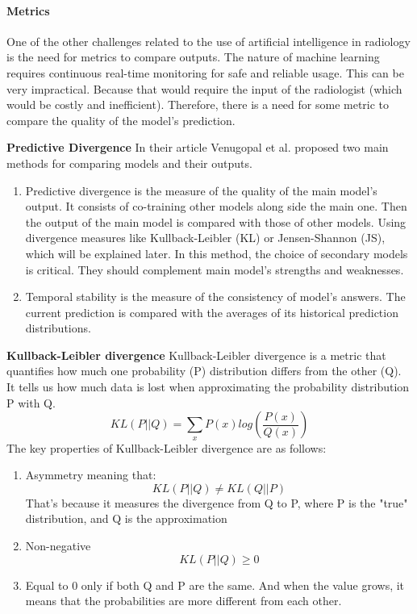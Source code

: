 \documentclass{IEEEcsmag}
\begin{document}
    \paragraph{Metrics}
    One of the other challenges related to the use of artificial intelligence in radiology is the need for metrics to compare outputs. 
    The nature of machine learning requires continuous real-time monitoring for safe and reliable usage.
    This can be very impractical.
    Because that would require the input of the radiologist (which would be costly and inefficient).
    Therefore, there is a need for some metric to compare the quality of the model's prediction.
    
    \textbf{Predictive Divergence}
    In their article Venugopal et al.\cite{cite-7} proposed two main methods for comparing models and their outputs.
    \begin{enumerate}
        \item Predictive divergence is the measure of the quality of the main model's output.
        It consists of co-training other models along side the main one. 
        Then the output of the main model is compared with those of other models.
        Using divergence measures like Kullback-Leibler (KL) or Jensen-Shannon (JS), which will be explained later.
        In this method, the choice of secondary models is critical.
        They should complement main model's strengths and weaknesses.
        \item Temporal stability is the measure of the consistency of model's answers.
        The current prediction is compared with the averages of its historical prediction distributions.
    \end{enumerate}

    \textbf{Kullback-Leibler divergence}
        Kullback-Leibler divergence is a metric that quantifies how much one probability (P) distribution differs from the other (Q).
        It tells us how much data is lost when approximating the probability distribution P with Q.
        \[
            KL(P||Q) = \sum_x P(x)log\left(\frac{P(x)}{Q(x)}\right)
        \]
        The key properties of Kullback-Leibler divergence are as follows:
        \begin{enumerate}
            \item Asymmetry meaning that:
            \[
                KL(P||Q) \neq KL(Q||P)
            \]
            That's because it measures the divergence from Q to P, where P is the "true" distribution, and Q is the approximation 
            \item Non-negative
            \[
                KL(P||Q) \geq 0 
            \]
            \item Equal to 0 only if both Q and P are the same. And when the value grows, it means that the probabilities are more different from each other.
        \end{enumerate}
        
\end{document}
